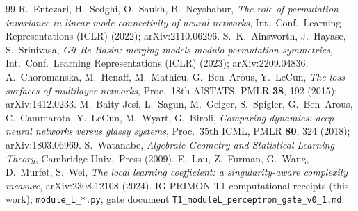 \documentclass[a4paper,11pt]{article}
\theoremstyle{plain}
\theoremstyle{definition}
\theoremstyle{remark}
\begin{document}
\begin{thebibliography}{99}
 R.~Entezari, H.~Sedghi, O.~Saukh, B.~Neyshabur, \emph{The role of permutation
  invariance in linear mode connectivity of neural networks}, Int.\ Conf.\ Learning Representations (ICLR)
  (2022); arXiv:2110.06296.
 S.~K.~Ainsworth, J.~Hayase, S.~Srinivasa, \emph{Git Re-Basin: merging models modulo
  permutation symmetries}, Int.\ Conf.\ Learning Representations (ICLR) (2023); arXiv:2209.04836.
 A.~Choromanska, M.~Henaff, M.~Mathieu, G.~Ben~Arous, Y.~LeCun, \emph{The loss
  surfaces of multilayer networks}, Proc.\ 18th AISTATS, PMLR \textbf{38}, 192 (2015); arXiv:1412.0233.
 M.~Baity-Jesi, L.~Sagun, M.~Geiger, S.~Spigler, G.~Ben~Arous, C.~Cammarota, Y.~LeCun,
  M.~Wyart, G.~Biroli, \emph{Comparing dynamics: deep neural networks versus glassy systems}, Proc.\ 35th
  ICML, PMLR \textbf{80}, 324 (2018); arXiv:1803.06969.
 S.~Watanabe, \emph{Algebraic Geometry and Statistical Learning Theory}, Cambridge
  Univ.\ Press (2009).
 E.~Lau, Z.~Furman, G.~Wang, D.~Murfet, S.~Wei, \emph{The local learning coefficient: a
  singularity-aware complexity measure}, arXiv:2308.12108 (2024).
 IG-PRIMON-T1 computational receipts (this work);
  \texttt{module\_L\_*.py}, gate document \texttt{T1\_moduleL\_perceptron\_gate\_v0\_1.md}.
\end{thebibliography}
\end{document}
